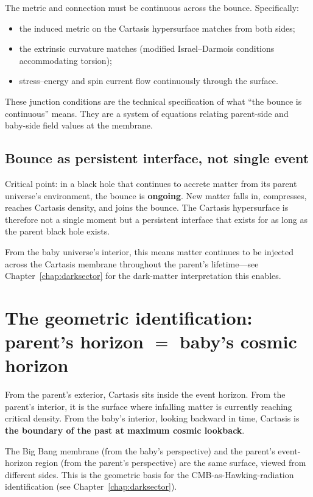 The metric and connection must be continuous across the bounce. Specifically:

\begin{itemize}
  \item the induced metric on the Cartasis hypersurface matches from both sides;
  \item the extrinsic curvature matches (modified Israel--Darmois conditions
    accommodating torsion);
  \item stress--energy and spin current flow continuously through the surface.
\end{itemize}

These junction conditions are the technical specification of what ``the bounce
is continuous'' means. They are a system of equations relating parent-side and
baby-side field values at the membrane.

\subsection{Bounce as persistent interface, not single event}

Critical point: in a black hole that continues to accrete matter from its parent
universe's environment, the bounce is \textbf{ongoing}. New matter falls in,
compresses, reaches Cartasis density, and joins the bounce. The Cartasis
hypersurface is therefore not a single moment but a persistent interface that
exists for as long as the parent black hole exists.

From the baby universe's interior, this means matter continues to be injected
across the Cartasis membrane throughout the parent's lifetime---see
Chapter~\ref{chap:darksector} for the dark-matter interpretation this enables.

\section{The geometric identification: parent's horizon $=$ baby's cosmic
  horizon}

From the parent's exterior, Cartasis sits inside the event horizon. From the
parent's interior, it is the surface where infalling matter is currently
reaching critical density. From the baby's interior, looking backward in time,
Cartasis is \textbf{the boundary of the past at maximum cosmic lookback}.

The Big Bang membrane (from the baby's perspective) and the parent's
event-horizon region (from the parent's perspective) are the same surface,
viewed from different sides. This is the geometric basis for the
CMB-as-Hawking-radiation identification (see Chapter~\ref{chap:darksector}).

